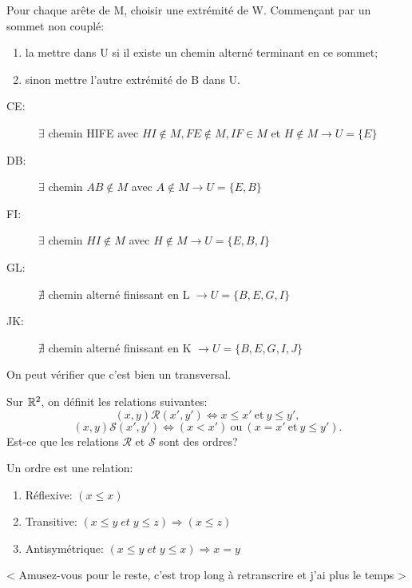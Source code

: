 Pour chaque arête de M, choisir une extrémité de W. Commençant par un sommet non couplé:

\begin{enumerate}[$\rightarrow$]
\item la mettre dans U si il existe un chemin alterné terminant en ce sommet;
\item sinon mettre l'autre extrémité de B dans U.
\end{enumerate}

\begin{description}
\item[CE:] $\exists$ chemin HIFE avec $HI \notin M, FE \notin M, IF \in M$ et $H \notin M \rightarrow U=\{ E\}$
\item[DB:] $\exists$ chemin $AB \notin M$ avec $A \notin M \rightarrow U= \{ E,B\}$
\item[FI:] $\exists$ chemin $HI \notin M$ avec $H \notin M \rightarrow U= \{ E,B,I\}$
\item[GL:] $\nexists$ chemin alterné finissant en L $\rightarrow U= \{ B,E,G,I\}$
\item[JK:] $\nexists$ chemin alterné finissant en K $\rightarrow U= \{ B,E,G,I,J\}$
\end{description}

On peut vérifier que c'est bien un transversal.

\newpage


\begin{exo}
Sur $\mathbb{R}^2$, on d\'efinit les relations suivantes:
\[(x,y)\mathcal{R}(x',y') \Leftrightarrow x \leq x' \mathrm{~et~} y \leq y', \]
\[(x,y)\mathcal{S}(x',y') \Leftrightarrow (x < x') \mathrm{~ou~} (x = x' \mathrm{~et~} y \leq y').\]
Est-ce que les relations $\mathcal{R}$ et $\mathcal{S}$ sont des ordres?
\end{exo}

Un ordre est une relation:

\begin{enumerate}
\item Réflexive: $(x \leq x)$
\item Transitive: $(x \leq y\;et\; y \leq z) \Rightarrow (x \leq z)$
\item Antisymétrique: $(x \leq y\;et\; y \leq x) \Rightarrow x=y$
\end{enumerate}

< Amusez-vous pour le reste, c'est trop long à retranscrire et j'ai plus le temps >

